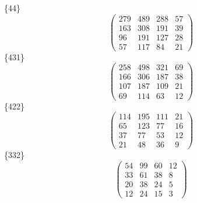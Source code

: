 \documentclass[12pt,reqno]{amsart}
\begin{document}
\{44\}                             $$ \begin{pmatrix} 
                       279 & 489 & 288 & 57 \\[6pt]
                       163 & 308 & 191 & 39 \\[6pt]
                        96 & 191 & 127 & 28 \\[6pt]
                          57 & 117 & 84 & 21
                              \end{pmatrix} $$ 
\{431\}                             $$ \begin{pmatrix} 
                       258 & 498 & 321 & 69 \\[6pt]
                       166 & 306 & 187 & 38 \\[6pt]
                       107 & 187 & 109 & 21 \\[6pt]
                          69 & 114 & 63 & 12
                              \end{pmatrix} $$ 
\{422\}                             $$ \begin{pmatrix} 
                       114 & 195 & 111 & 21 \\[6pt]
                        65 & 123 & 77 & 16 \\[6pt]
                         37 & 77 & 53 & 12 \\[6pt]
                           21 & 48 & 36 & 9
                              \end{pmatrix} $$ 
\{332\}                             $$ \begin{pmatrix} 
                         54 & 99 & 60 & 12 \\[6pt]
                         33 & 61 & 38 & 8 \\[6pt]
                         20 & 38 & 24 & 5 \\[6pt]
                           12 & 24 & 15 & 3
                              \end{pmatrix} $$ 
\end{document}
